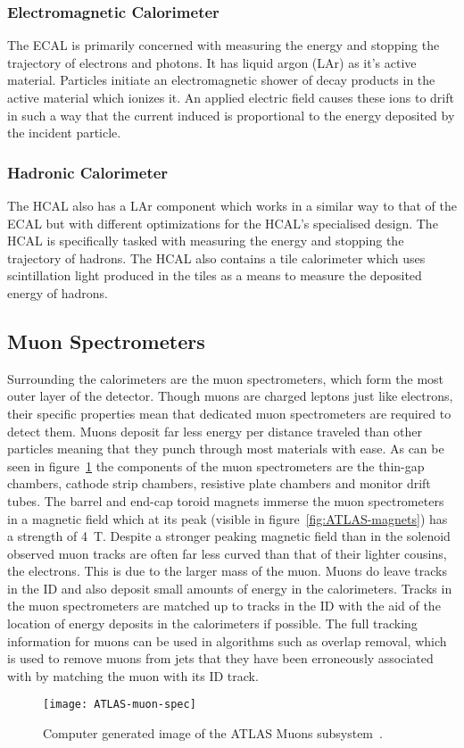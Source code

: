 \subsubsection{Electromagnetic Calorimeter}
The ECAL is primarily concerned with measuring the energy and stopping the
trajectory of electrons and photons. It has liquid argon (LAr) as it's active
material. Particles initiate an electromagnetic shower of decay products in the
active material which ionizes it. An applied electric field causes these ions to
drift in such a way that the current induced is proportional to the energy
deposited by the incident particle.

\subsubsection{Hadronic Calorimeter}
The HCAL also has a LAr component which works in a similar way to that of the
ECAL but with different optimizations for the HCAL's specialised design. The
HCAL is specifically tasked with measuring the energy and stopping the
trajectory of hadrons. The HCAL also contains a tile calorimeter which uses
scintillation light produced in the tiles as a means to measure the deposited
energy of hadrons.

\subsection{Muon Spectrometers}%
\label{sec:muon}

Surrounding the calorimeters are the muon spectrometers, which form the most
outer layer of the detector. Though muons are charged leptons just like
electrons, their specific properties mean that dedicated muon spectrometers are
required to detect them. Muons deposit far less energy per distance traveled
than other particles meaning that they punch through most materials with ease.
As can be seen in figure~\ref{fig:ATLAS-muon} the components of the muon
spectrometers are the thin-gap chambers, cathode strip chambers, resistive plate
chambers and monitor drift tubes. The barrel and end-cap toroid magnets immerse
the muon spectrometers in a magnetic field which at its peak (visible in
figure~\ref{fig:ATLAS-magnets}) has a strength of 4~T. Despite a stronger
peaking magnetic field than in the solenoid observed muon tracks are often far
less curved than that of their lighter cousins, the electrons. This is due to the
larger mass of the muon. Muons do leave tracks in the ID and also deposit
small amounts of energy in the calorimeters. Tracks in the muon spectrometers are
matched up to tracks in the ID with the aid of the location of energy deposits
in the calorimeters if possible. The full tracking information for muons can be
used in algorithms such as overlap removal, which is used to remove muons from
jets that they have been erroneously associated with by matching the muon with
its ID track.
\begin{figure}[h]
  \centering
  \texttt{[image: ATLAS-muon-spec]}
  \caption[ATLAS muon subsystem]{Computer generated image of the ATLAS Muons
    subsystem~\cite{ATLAS-muon-fig}.}%
  \label{fig:ATLAS-muon}
\end{figure}

